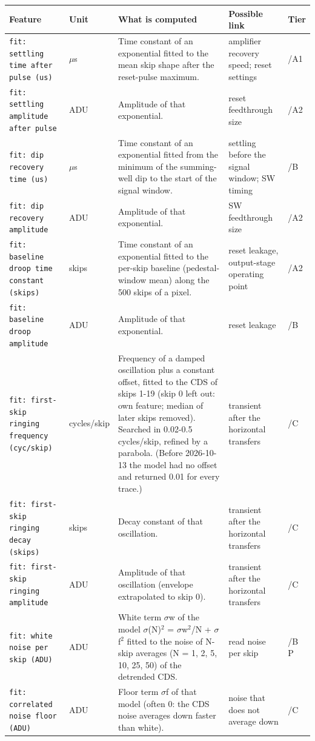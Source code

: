\documentclass[10pt]{article}
\renewcommand{\_}{\oldunderscore\allowbreak}
\begin{document}
\begin{longtable}{>{\raggedright\arraybackslash}p{}>{\raggedright\arraybackslash}p{}>{\raggedright\arraybackslash}p{}>{\raggedright\arraybackslash}p{}>{\raggedright\arraybackslash}p{}}
\toprule Feature & Unit & What is computed & Possible link & Tier \\ \midrule \endhead
\bottomrule \endfoot
\texttt{fit: settling time after pulse (us)} & $\mu$s & Time constant of an exponential fitted to the mean skip shape after the reset-pulse maximum. & amplifier recovery speed; reset settings & 0/A1 \\
\texttt{fit: settling amplitude after pulse} & ADU & Amplitude of that exponential. & reset feedthrough size & 0/A2 \\
\texttt{fit: dip recovery time (us)} & $\mu$s & Time constant of an exponential fitted from the minimum of the summing-well dip to the start of the signal window. & settling before the signal window; SW timing & 0/B \\
\texttt{fit: dip recovery amplitude} & ADU & Amplitude of that exponential. & SW feedthrough size & 0/A2 \\
\texttt{fit: baseline droop time constant (skips)} & skips & Time constant of an exponential fitted to the per-skip baseline (pedestal-window mean) along the 500 skips of a pixel. & reset leakage, output-stage operating point & 0/A2 \\
\texttt{fit: baseline droop amplitude} & ADU & Amplitude of that exponential. & reset leakage & 0/B \\
\texttt{fit: first-skip ringing frequency (cyc/skip)} & cycles/\allowbreak{}skip & Frequency of a damped oscillation plus a constant offset, fitted to the CDS of skips 1-19 (skip 0 left out: own feature; median of later skips removed). Searched in 0.02-0.5 cycles/skip, refined by a parabola. (Before 2026-10-13 the model had no offset and returned 0.01 for every trace.) & transient after the horizontal transfers & 0/C \\
\texttt{fit: first-skip ringing decay (skips)} & skips & Decay constant of that oscillation. & transient after the horizontal transfers & 0/C \\
\texttt{fit: first-skip ringing amplitude} & ADU & Amplitude of that oscillation (envelope extrapolated to skip 0). & transient after the horizontal transfers & 0/C \\
\texttt{fit: white noise per skip (ADU)} & ADU & White term $\sigma$\_w of the model $\sigma$(N)$^{2}$ = $\sigma$\_w$^{2}$/N + $\sigma$\_f$^{2}$ fitted to the noise of N-skip averages (N = 1, 2, 5, 10, 25, 50) of the detrended CDS. & read noise per skip & 0/B P \\
\texttt{fit: correlated noise floor (ADU)} & ADU & Floor term $\sigma$\_f of that model (often 0: the CDS noise averages down faster than white). & noise that does not average down & 0/C \\
\end{longtable}
\end{document}

